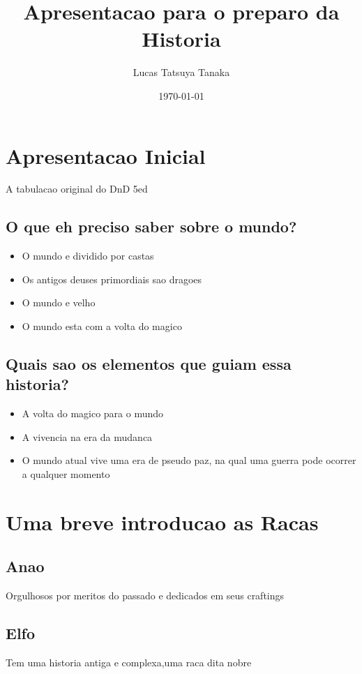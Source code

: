 \documentclass{book}
\title{Apresentacao para o preparo da Historia}
\author{Lucas Tatsuya Tanaka}
\date{\today}
\begin{document}
\maketitle
\tableofcontents

\chapter{Apresentacao Inicial}
{\huge A tabulacao original do DnD 5ed}
\linebreak


\section{O que eh preciso saber sobre o mundo?}
\begin{itemize}
    \item O mundo e dividido por castas 
    \item Os antigos deuses primordiais sao dragoes
    \item O mundo e velho 
    \item O mundo esta com a volta do magico 

\end{itemize}
    
\section{Quais sao os elementos que guiam essa historia?}
\begin{itemize}
    \item A volta do magico para o mundo 
    \item A vivencia na era da mudanca 
    \item O mundo atual vive uma era de pseudo paz, na qual uma guerra pode ocorrer a
    qualquer momento
\end{itemize}

\chapter{Uma breve introducao as Racas}
\section{Anao}
Orgulhosos por meritos do passado e dedicados em seus craftings
\section{Elfo}
Tem uma historia antiga e complexa,uma raca dita nobre 
\end{document}
